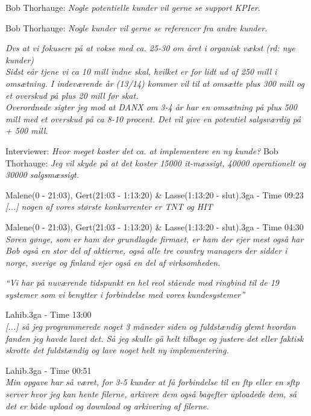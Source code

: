 \begin{thebibliography}{9}
	Bob Thorhauge: \textit{Nogle potentielle kunder vil gerne se support KPIer.}

	Bob Thorhauge: \textit{Nogle kunder vil gerne se referencer fra andre kunder.}

	\textit{Dvs at vi fokusere på at vokse med ca. 25-30 om året i organisk vækst \emph{(rd: nye kunder)}}\\
\textit{Sidst eår tjene vi ca 10 mill indne skal, hvilket er for lidt ud af 250 mill i omsætning. I indeværende år (13/14) kommer vil til at omsætte plus 300 mill og et overskud på plus 20 mill før skat.}\\
\textit{Overordnede sigter jeg mod at DANX om 3-4 år har en omsætning på plus 500 mill med et overskud på ca 8-10 procent. Det vil give en potentiel salgsværdig på + 500 mill.}

	Interviewer: \textit{Hvor meget koster det ca. at implementere en ny kunde?} Bob Thorhauge: 
	\textit{Jeg vil skyde på at det koster 15000 it-mæssigt, 40000 operationelt og 30000 salgsmæssigt.}

	Malene(0 - 21:03), Gert(21:03 - 1:13:20) \& Lasse(1:13:20 - slut).3ga - Time 09:23\\
	\textit{[...] nogen af vores største konkurrenter er TNT og HIT}

	Malene(0 - 21:03), Gert(21:03 - 1:13:20) \& Lasse(1:13:20 - slut).3ga - Time 04:30\\
	\textit{Søren gønge, som er ham der grundlagde firmaet, er ham der ejer mest også har Bob også en stor del af aktierne, også alle tre country managers der sidder i norge, sverige og finland ejer også en del af virksomheden.}

	\textit{“Vi har på nuværende tidspunkt en hel reol stående med ringbind til de 19 systemer som vi benytter i forbindelse med vores kundesystemer”}

	Lahib.3ga - Time 13:00\\
	\textit{[...] så jeg programmerede noget 3 måneder siden og fuldstændig glemt hvordan fanden jeg havde lavet det. Så jeg skulle gå helt tilbage og justere det eller faktisk skrotte det fuldstændig og lave noget helt ny implementering.}

	Lahib.3ga - Time 00:51\\
	\textit{Min opgave har så været, for 3-5 kunder at få forbindelse til en ftp eller en sftp server hvor jeg kan hente filerne, arkivere dem også bagefter uploadede dem, så det er både upload og download og arkivering af filerne.}


\end{thebibliography}

